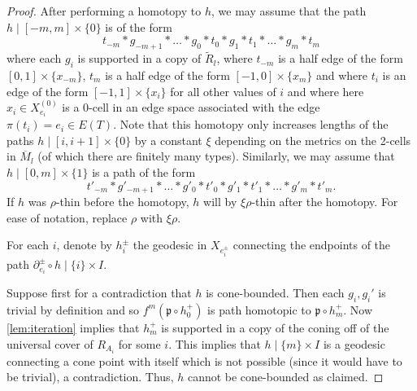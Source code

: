 \documentclass[10pt,a4paper]{amsart}
\newcommand{\wt}[1]{\widetilde{ #1 }}
\begin{document}
\begin{proof}
After performing a homotopy to $h$, we may assume that the path $h\mid[-m, m]\times \{0\}$ is of the form
\[
t_{-m}*g_{-m+1}*\ldots*g_0*t_0*g_1*t_1*\ldots*g_m*t_m
\]
where each $g_i$ is supported in a copy of $\wt{R}_{l}$, where $t_{-m}$ is a half edge of the form $[0, 1]\times\{x_{-m}\}$, $t_m$ is a half edge of the form $[-1, 0]\times\{x_m\}$ and where $t_i$ is an edge of the form $[-1, 1]\times\{x_i\}$ for all other values of $i$ and where here $x_i\in X_{e_i}^{(0)}$ is a 0-cell in an edge space associated with the edge $\pi(t_i) = e_i\in E(T)$. Note that this homotopy only increases lengths of the paths $h\mid[i, i+1]\times\{0\}$ by a constant $\xi$ depending on the metrics on the 2-cells in $\overline{M}_l$ (of which there are finitely many types). Similarly, we may assume that $h\mid[0, m]\times \{1\}$ is a path of the form
\[
t'_{-m}*g'_{-m+1}*\ldots*g'_0*t'_0*g'_1*t'_1*\ldots*g'_m*t'_m.
\]
If $h$ was $\rho$-thin before the homotopy, $h$ will by $\xi\rho$-thin after the homotopy. For ease of notation, replace $\rho$ with $\xi\rho$.

For each $i$, denote by $h_i^{\pm}$ the geodesic in $X_{e_i^{\pm}}$ connecting the endpoints of the path $\partial^{\pm}_{e_i}\circ h\mid\{i\}\times I$.

Suppose first for a contradiction that $h$ is cone-bounded. Then each $g_i, g_i'$ is trivial by definition and so $f^m(\mathfrak{p}\circ h_0^+)$ is path homotopic to $\mathfrak{p}\circ h_m^+$. Now \cref{lem:iteration} implies that $h_m^+$ is supported in a copy of the coning off of the universal cover of $R_{A_i}$ for some $i$. This implies that $h\mid\{m\}\times I$ is a geodesic connecting a cone point with itself which is not possible (since it would have to be trivial), a contradiction. Thus, $h$ cannot be cone-bounded as claimed.


\end{proof}
\end{document}
